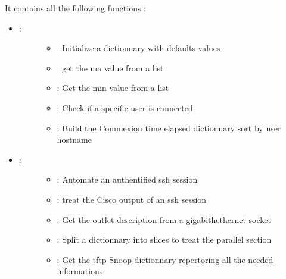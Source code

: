 \documentclass[letterpaper,10pt,english]{sphinxmanual}
\begin{document}
\sphinxAtStartPar
It contains all the following functions :
\begin{itemize}
\item {} \begin{description}
\item[{ :}] \leavevmode\begin{itemize}
\item {} 
\sphinxAtStartPar
{} : Initialize a dictionnary with defaults values

\item {} 
\sphinxAtStartPar
{} : get the ma value from a list

\item {} 
\sphinxAtStartPar
{} : Get the min value from a list

\item {} 
\sphinxAtStartPar
{} : Check if a specific user is connected

\item {} 
\sphinxAtStartPar
{} : Build the Commexion time elapsed dictionnary sort by user hostname

\end{itemize}

\end{description}

\item {} \begin{description}
\item[{ :}] \leavevmode\begin{itemize}
\item {} 
\sphinxAtStartPar
{} : Automate an authentified ssh session

\item {} 
\sphinxAtStartPar
{} : treat the Cisco output of an ssh session

\item {} 
\sphinxAtStartPar
{} : Get the outlet description from a gigabithethernet socket

\item {} 
\sphinxAtStartPar
{} : Split a dictionnary into slices to treat the parallel section

\item {} 
\sphinxAtStartPar
{} : Get the tftp Snoop dictionnary repertoring all the needed informations


\end{itemize}
\end{description}
\end{itemize}
\end{document}
